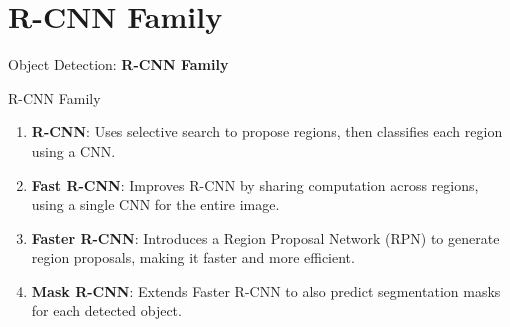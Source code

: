 \section{R-CNN Family}
\begin{frame}{}
    \LARGE Object Detection: \textbf{R-CNN Family}
\end{frame}

\begin{frame}[allowframebreaks]{R-CNN Family}
    \begin{figure}
        \centering
    \end{figure}

    \framebreak

    \begin{enumerate}
        \setlength{\itemsep}{1em}
        \item \textbf{R-CNN}: Uses selective search to propose regions, then classifies each region using a CNN.
        \item \textbf{Fast R-CNN}: Improves R-CNN by sharing computation across regions, using a single CNN for the entire image.
        \item \textbf{Faster R-CNN}: Introduces a Region Proposal Network (RPN) to generate region proposals, making it faster and more efficient.
        \item \textbf{Mask R-CNN}: Extends Faster R-CNN to also predict segmentation masks for each detected object.
    \end{enumerate}
\end{frame}





